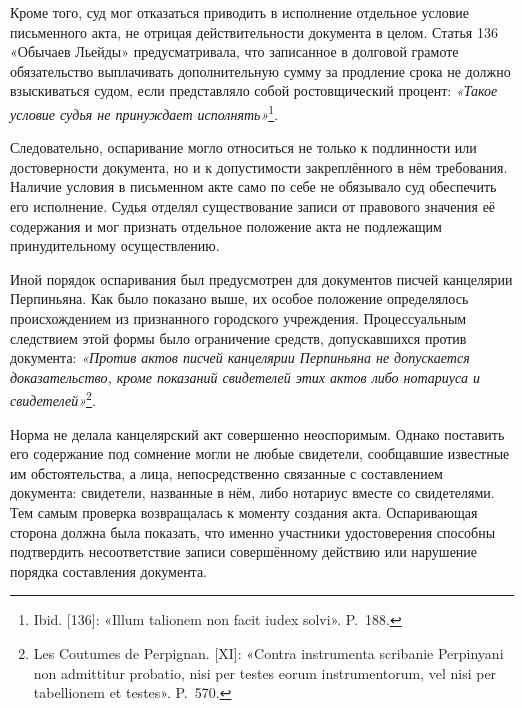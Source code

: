 Кроме того, суд мог отказаться приводить в исполнение отдельное условие письменного акта, не отрицая действительности документа в целом. Статья 136 «Обычаев Льейды» предусматривала, что записанное в долговой грамоте обязательство выплачивать дополнительную сумму за продление срока не должно взыскиваться судом, если представляло собой ростовщический процент: \emph{«Такое условие судья не принуждает исполнять»}\footnote{Ibid. [136]: «Illum talionem non facit iudex solvi». P.~188.}.

Следовательно, оспаривание могло относиться не только к подлинности или достоверности документа, но и к допустимости закреплённого в нём требования. Наличие условия в письменном акте само по себе не обязывало суд обеспечить его исполнение. Судья отделял существование записи от правового значения её содержания и мог признать отдельное положение акта не подлежащим принудительному осуществлению.

Иной порядок оспаривания был предусмотрен для документов писчей канцелярии Перпиньяна. Как было показано выше, их особое положение определялось происхождением из признанного городского учреждения. Процессуальным следствием этой формы было ограничение средств, допускавшихся против документа: \emph{«Против актов писчей канцелярии Перпиньяна не допускается доказательство, кроме показаний свидетелей этих актов либо нотариуса и свидетелей»}\footnote{Les Coutumes de Perpignan. [XI]: «Contra instrumenta scribanie Perpinyani non admittitur probatio, nisi per testes eorum instrumentorum, vel nisi per tabellionem et testes». P.~570.}.

Норма не делала канцелярский акт совершенно неоспоримым. Однако поставить его содержание под сомнение могли не любые свидетели, сообщавшие известные им обстоятельства, а лица, непосредственно связанные с составлением документа: свидетели, названные в нём, либо нотариус вместе со свидетелями. Тем самым проверка возвращалась к моменту создания акта. Оспаривающая сторона должна была показать, что именно участники удостоверения способны подтвердить несоответствие записи совершённому действию или нарушение порядка составления документа.

